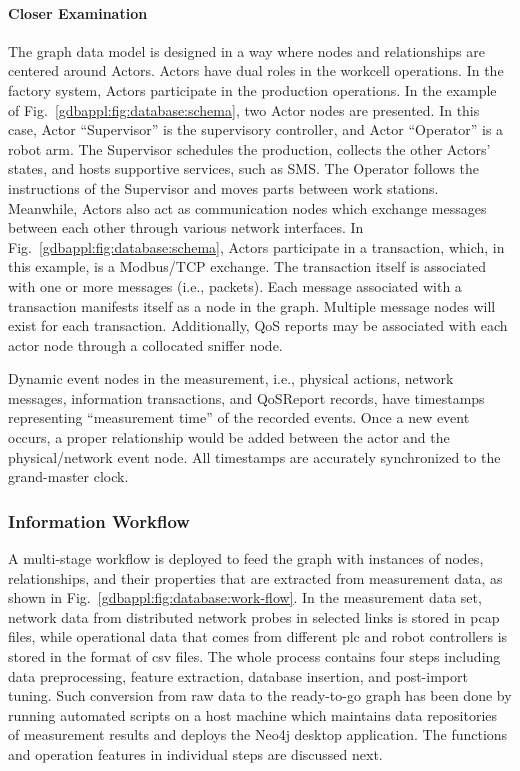 \paragraph{Closer Examination}
The graph data model is designed in a way where nodes and relationships are centered around Actors. Actors have dual roles in the workcell operations. In the factory system, Actors participate in the production operations.
In the example of Fig.~\ref{gdbappl:fig:database:schema}, two Actor nodes are presented. In this case, Actor ``Supervisor'' is the supervisory controller, and Actor ``Operator'' is a robot arm. The Supervisor schedules the production, collects the other Actors' states, and hosts supportive services, such as SMS. The Operator follows the instructions of the Supervisor and moves parts between work stations. Meanwhile, Actors also act as communication nodes which exchange messages between each other through various network interfaces. In Fig.~\ref{gdbappl:fig:database:schema}, Actors participate in a transaction, which, in this example, is a Modbus/TCP exchange. The transaction itself is associated with one or more messages (i.e., packets). Each message associated with a transaction manifests itself as a node in the graph. Multiple message nodes will exist for each transaction. Additionally, QoS reports may be associated with each actor node through a collocated sniffer node.  %

Dynamic event nodes in the measurement, i.e., physical actions, network messages, information transactions, and QoSReport records, have timestamps representing ``measurement time'' of the recorded events. Once a new event occurs, a proper relationship would be added between the actor and the physical/network event node. All timestamps are accurately synchronized to the grand-master clock.


\subsubsection{Information Workflow}

A multi-stage workflow is deployed to feed the graph with instances of nodes, relationships, and their properties that are extracted from measurement data, as shown in Fig.~\ref{gdbappl:fig:database:work-flow}. In the measurement data set, network data from distributed network probes in selected links is stored in \gls{pcap} files, while operational data that comes from different \gls{plc} and robot controllers is stored in the format of \gls{csv} files. The whole process contains four steps including data preprocessing, feature extraction, database insertion, and post-import tuning. Such conversion from raw data to the ready-to-go graph has been done  by running automated scripts on a host machine which maintains data repositories of measurement results and deploys the Neo4j desktop application. The functions and operation features in individual steps are discussed next. 


